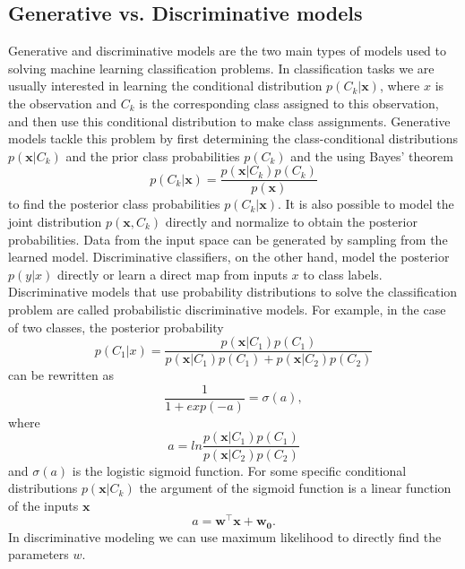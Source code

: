 \documentclass[a4paper,fleqn]{cas-dc}
\begin{document}
\subsection{Generative vs. Discriminative models}
Generative and discriminative models are the two main types of models used to solving machine learning classification problems. In classification tasks we are usually interested in learning the conditional distribution \(p(C_k|\boldsymbol{x}) \), where \(x \) is the observation and \(C_k \) is the corresponding class assigned to this observation, and then use this conditional distribution to make class assignments. Generative models tackle this problem by first  determining the class-conditional distributions \(p(\boldsymbol{x}|C_k) \) and the prior class probabilities \(p(C_k) \) and the using Bayes' theorem
\[
p(C_k|\boldsymbol{x})  = \frac{p(\boldsymbol{x}|C_k)p(C_k)}{p(\boldsymbol{x})}
\]
to find the posterior class probabilities \(p(C_k|\boldsymbol{x})\). It is also possible to model the joint distribution \(p(\boldsymbol{x}, C_k)\) directly and normalize to obtain the posterior probabilities. Data from the input space can be generated by sampling from the learned model.  \newline
Discriminative classifiers, on the other hand, model the posterior \(p(y|x)\) directly or learn a direct map from inputs \(x\) to class labels. Discriminative models that use probability distributions to solve the classification problem are called probabilistic discriminative models. For example, in the case of two classes, the posterior probability \[ p(C_1|x)= \frac{p(\boldsymbol{x}|C_1)p(C_1)}{p(\boldsymbol{x}|C_1)p(C_1)+ p(\boldsymbol{x}|C_2)p(C_2)}\]
can be rewritten as \[\frac{1}{1+exp(-a)} = \sigma(a),\]
where \[
a=ln\frac{p(\boldsymbol{x}|C_1)p(C_1)}{p(\boldsymbol{x}|C_2)p(C_2)}
\] and \(\sigma(a) \) is the logistic sigmoid function. For some specific conditional distributions \(p(\boldsymbol{x}|C_k)\) the argument of the sigmoid function is a linear function of the inputs \(\boldsymbol{x} \) \[
a = \boldsymbol{w^\intercal\boldsymbol{x} + w_0}.
\]
In discriminative modeling we can use maximum likelihood to directly find the parameters \(w\).
\end{document}
